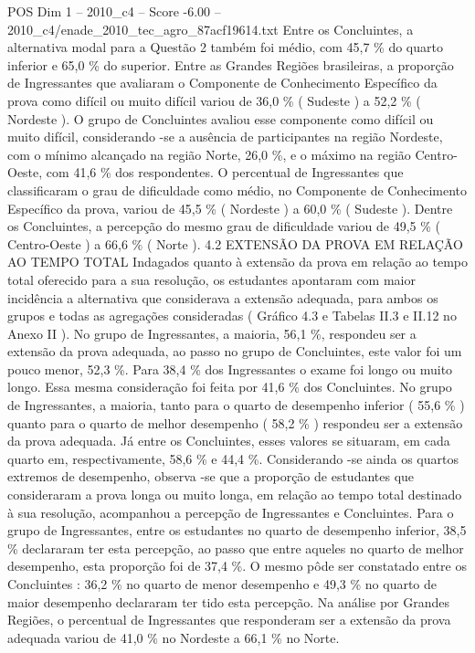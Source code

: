 \begin{textsample}{POS Dim 1 – 2010\_c4 – Score -6.00 – 2010\_c4/enade\_2010\_tec\_agro\_87acf19614.txt}
Entre os Concluintes, a alternativa modal para a Questão 2 também foi médio, com 45,7 \% do quarto inferior e 65,0 \% do superior.
Entre as Grandes Regiões brasileiras, a proporção de Ingressantes que avaliaram o Componente de Conhecimento Específico da prova como difícil ou muito difícil variou de 36,0 \% ( Sudeste ) a 52,2 \% ( Nordeste ).
O grupo de Concluintes avaliou esse componente como difícil ou muito difícil, considerando -se a ausência de participantes na região Nordeste, com o mínimo alcançado na região Norte, 26,0 \%, e o máximo na região Centro-Oeste, com 41,6 \% dos respondentes.
O percentual de Ingressantes que classificaram o grau de dificuldade como médio, no Componente de Conhecimento Específico da prova, variou de 45,5 \% ( Nordeste ) a 60,0 \% ( Sudeste ).
Dentre os Concluintes, a percepção do mesmo grau de dificuldade variou de 49,5 \% ( Centro-Oeste ) a 66,6 \% ( Norte ). 4.2 EXTENSÃO DA PROVA EM RELAÇÃO AO TEMPO TOTAL Indagados quanto à extensão da prova em relação ao tempo total oferecido para a sua resolução, os estudantes apontaram com maior incidência a alternativa que considerava a extensão adequada, para ambos os grupos e todas as agregações consideradas ( Gráfico 4.3 e Tabelas II.3 e II.12 no Anexo II ).
No grupo de Ingressantes, a maioria, 56,1 \%, respondeu ser a extensão da prova adequada, ao passo no grupo de Concluintes, este valor foi um pouco menor, 52,3 \%.
Para 38,4 \% dos Ingressantes o exame foi longo ou muito longo.
Essa mesma consideração foi feita por 41,6 \% dos Concluintes.
No grupo de Ingressantes, a maioria, tanto para o quarto de desempenho inferior ( 55,6 \% ) quanto para o quarto de melhor desempenho ( 58,2 \% ) respondeu ser a extensão da prova adequada.
Já entre os Concluintes, esses valores se situaram, em cada quarto em, respectivamente, 58,6 \% e 44,4 \%.
Considerando -se ainda os quartos extremos de desempenho, observa -se que a proporção de estudantes que consideraram a prova longa ou muito longa, em relação ao tempo total destinado à sua resolução, acompanhou a percepção de Ingressantes e Concluintes.
Para o grupo de Ingressantes, entre os estudantes no quarto de desempenho inferior, 38,5 \% declararam ter esta percepção, ao passo que entre aqueles no quarto de melhor desempenho, esta proporção foi de 37,4 \%.
O mesmo pôde ser constatado entre os Concluintes : 36,2 \% no quarto de menor desempenho e 49,3 \% no quarto de maior desempenho declararam ter tido esta percepção.
Na análise por Grandes Regiões, o percentual de Ingressantes que responderam ser a extensão da prova adequada variou de 41,0 \% no Nordeste a 66,1 \% no Norte.

\end{textsample}
